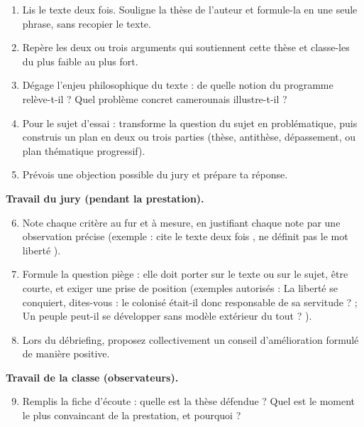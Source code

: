 \documentclass[11pt]{article}
\newcounter{popsec}
\newcounter{popsub}
\newcommand{\courssub}[1]{%
  \stepcounter{popsub}%
  \par\vspace{9pt}\noindent{\popxbold\fontsize{11.5}{13}\selectfont\color{popink}{\color{poporange}\thepopsec.\thepopsub}\hspace{6pt}#1}\par\nopagebreak\vspace{4pt}
}
\begin{document}
\begin{enumerate}
\item Lis le texte deux fois. Souligne la thèse de l'auteur et formule-la en une seule phrase, sans recopier le texte.
\item Repère les deux ou trois arguments qui soutiennent cette thèse et classe-les du plus faible au plus fort.
\item Dégage l'enjeu philosophique du texte : de quelle notion du programme relève-t-il ? Quel problème concret camerounais illustre-t-il ?
\item Pour le sujet d'essai : transforme la question du sujet en problématique, puis construis un plan en deux ou trois parties (thèse, antithèse, dépassement, ou plan thématique progressif).
\item Prévois une objection possible du jury et prépare ta réponse.
\end{enumerate}

\textbf{Travail du jury (pendant la prestation).}

\begin{enumerate}
\setcounter{enumi}{5}
\item Note chaque critère au fur et à mesure, en justifiant chaque note par une observation précise (exemple : \og cite le texte deux fois \fg, \og ne définit pas le mot liberté \fg).
\item Formule la question piège : elle doit porter sur le texte ou sur le sujet, être courte, et exiger une prise de position (exemples autorisés : \og La liberté se conquiert, dites-vous : le colonisé était-il donc responsable de sa servitude ? \fg ; \og Un peuple peut-il se développer sans modèle extérieur du tout ? \fg).
\item Lors du débriefing, proposez collectivement un conseil d'amélioration formulé de manière positive.
\end{enumerate}

\textbf{Travail de la classe (observateurs).}

\begin{enumerate}
\setcounter{enumi}{8}
\item Remplis la fiche d'écoute : quelle est la thèse défendue ? Quel est le moment le plus convaincant de la prestation, et pourquoi ?
\end{enumerate}

\courssub{Ressources à mobiliser}
\end{document}
